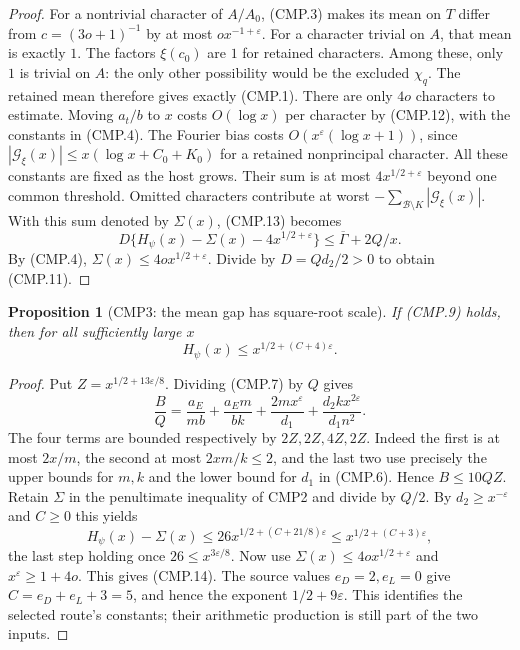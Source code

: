 \documentclass[11pt,a4paper]{article}
\numberwithin{equation}{section}
\newtheorem{proposition}[theorem]{Proposition}
\theoremstyle{remark}\newtheorem{remark}[theorem]{Remark}
\begin{document}
\begin{proof}
For a nontrivial character of $A/A_0$, (CMP.3) makes its mean on
$T$ differ from $c=(3o+1)^{-1}$ by at most
$ox^{-1+\varepsilon}$.  For a character trivial on $A$, that
mean is exactly $1$.  The factors $\xi(c_0)$ are $1$ for
retained characters.  Among these, only $1$ is trivial on $A$:
the only other possibility would be the excluded $\chi_q$.
The retained mean therefore gives exactly (CMP.1).  There are
only $4o$ characters to estimate.  Moving $a_t/b$ to $x$ costs
$O(\log x)$ per character by (CMP.12), with the constants in
(CMP.4).  The Fourier bias costs
$O(x^\varepsilon(\log x+1))$, since
$|\mathcal G_\xi(x)|\le x(\log x+C_0+K_0)$ for a retained
nonprincipal character.  All these constants are fixed as the
host grows.  Their sum is at most $4x^{1/2+\varepsilon}$ beyond
one common threshold.  Omitted characters contribute at worst
$-\sum_{\mathcal B\setminus K}|\mathcal G_\xi(x)|$.
With this sum denoted by $\Sigma(x)$, (CMP.13) becomes
\[
 D\{H_\psi(x)-\Sigma(x)-4x^{1/2+\varepsilon}\}
                       \le\overline\Gamma+2Q/x.
\]
By (CMP.4), $\Sigma(x)\le4o x^{1/2+\varepsilon}$.
Divide by $D=Qd_2/2>0$ to obtain (CMP.11).
\end{proof}

\begin{proposition}[CMP3: the mean gap has square-root scale]
\label{claim:CMP3}
If (CMP.9) holds, then for all sufficiently large $x$
\[
                     H_\psi(x)\le x^{1/2+(C+4)\varepsilon}.
 \tag{CMP.14}
\]
\end{proposition}
\begin{proof}
Put $Z=x^{1/2+13\varepsilon/8}$.  Dividing (CMP.7) by $Q$ gives
\[
 \frac BQ=\frac{a_E}{mb}+\frac{a_Em}{bk}
           +\frac{2mx^\varepsilon}{d_1}
           +\frac{d_2kx^{2\varepsilon}}{d_1n^2}.
\]
The four terms are bounded respectively by $2Z,2Z,4Z,2Z$.
Indeed the first is at most $2x/m$, the second at most
$2xm/k\le2$, and the last two use precisely the upper bounds
for $m,\allowbreak{} k$ and the lower bound for $d_1$ in (CMP.6).
Hence $B\le10QZ$.
Retain $\Sigma$ in the penultimate inequality of CMP2 and divide
by $Q/2$.  By $d_2\ge x^{-\varepsilon}$ and $C\ge0$ this yields
\[
 H_\psi(x)-\Sigma(x)
          \le26x^{1/2+(C+21/8)\varepsilon}
          \le x^{1/2+(C+3)\varepsilon},
\]
the last step holding once $26\le x^{3\varepsilon/8}$.
Now use $\Sigma(x)\le4o x^{1/2+\varepsilon}$ and
$x^\varepsilon\ge1+4o$.  This gives (CMP.14).
The source values $e_D=2,\allowbreak{} e_L=0$ give
$C=e_D+e_L+3=5$, and hence the exponent $1/2+9\varepsilon$.
This identifies the selected route's constants; their arithmetic
production is still part of the two inputs.
\end{proof}
\end{document}
